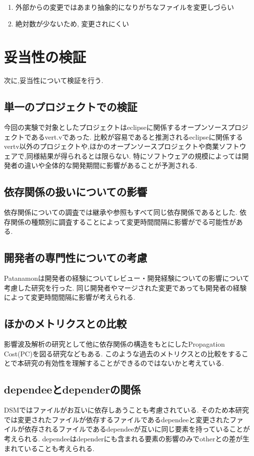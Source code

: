 \documentclass{fose2016}           %
\begin{document}
\begin{enumerate}
\item 外部からの変更ではあまり抽象的になりがちなファイルを変更しづらい
\item 絶対数が少ないため, 変更されにくい
\end{enumerate}

\section{妥当性の検証}\label{妥当性の検証}
次に,妥当性について検証を行う.

\subsection{単一のプロジェクトでの検証}
今回の実験で対象としたプロジェクトはeclipseに関係するオープンソースプロジェクトであるvert.vであった.
比較が容易であると推測されるeclipseに関係するvertv以外のプロジェクトや,ほかのオープンソースプロジェクトや商業ソフトウェアで,同様結果が得られるとは限らない.
特にソフトウェアの規模によっては開発者の違いや全体的な開発期間に影響があることが予測される.

\subsection{依存関係の扱いについての影響}
依存関係についての調査では継承や参照もすべて同じ依存関係であるとした.
依存関係の種類\cite{Kotani}別に調査することによって変更時間間隔に影響がでる可能性がある.

\subsection{開発者の専門性についての考慮}
Patanamonは開発者の経験についてレビュー・開発経験についての影響について考慮した研究を行った\cite{Patanamon2}.
同じ開発者やマージされた変更であっても開発者の経験によって変更時間間隔に影響が考えられる.

\subsection{ほかのメトリクスとの比較}
影響波及解析の研究として他に依存関係の構造をもとにしたPropagation Cost(PC)を図る研究などもある\cite{Nord}.
このような過去のメトリクスとの比較をすることで本研究の有効性を理解することができるのではないかと考えている.

\subsection{dependeeとdependerの関係}
DSMではファイルがお互いに依存しあうことも考慮されている.
そのため本研究では変更されたファイルが依存するファイルであるdependeeと変更されたファイルが依存されるファイルであるdependeeが互いに同じ要素を持っていることが考えられる.
dependeeはdependerにも含まれる要素の影響のみでotherとの差が生まれていることも考えられる.
\end{document}
